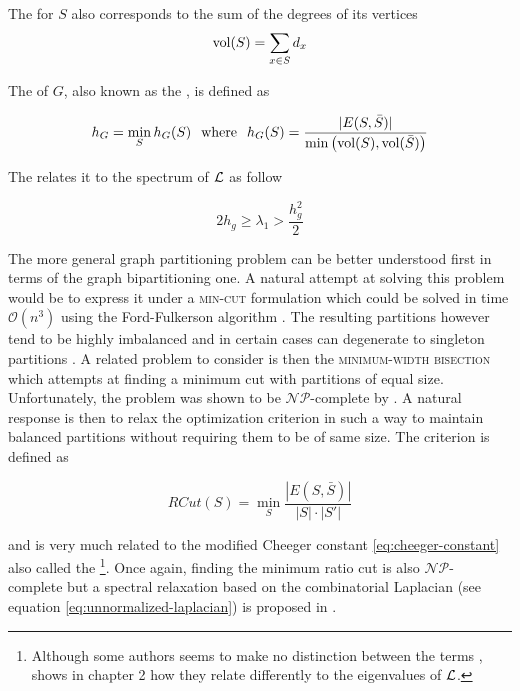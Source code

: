 The  for $S$ also corresponds to the sum of the degrees of its vertices
\begin{equation}
\operatorname{\text{vol}}(S) = \sum_{x \in S} d_x
\end{equation}

The  of $G$, also known as the  \parencite{Chung1997}, is defined as

\begin{equation}
h_G = \min_S h_G(S) \hspace{2.5mm} \text{where} \hspace{2.5mm} h_G(S) = \frac{ |E(S, \bar{S}) |}{\min \left( \operatorname{\text{vol}}(S), \operatorname{\text{vol}}(\bar{S}) \right)}
\label{eq:cheeger-constant}
\end{equation}

The  relates it to the spectrum of $\mathbf{\mathcal{L}}$ as follow \parencite{Chung1997}
\begin{lem}
\begin{equation}
2h_g \geq \lambda_1 > \frac{h_g^2}{2}
\end{equation}
\end{lem}

The more general graph partitioning problem can be better understood first in terms of
the graph bipartitioning one. A natural attempt at solving this problem would be to
express it under a \textsc{min-cut} formulation which could be solved in time
$\mathcal{O}(n^3)$ using the Ford-Fulkerson algorithm \cite{FordFulkerson1956}. The
resulting partitions however tend to be highly imbalanced and in certain cases can
degenerate to singleton partitions \cite{Hagen1992}. A related problem to consider is
then the \textsc{minimum-width bisection} which attempts at finding a minimum cut
with partitions of equal size. Unfortunately, the problem was shown to be
$\mathcal{NP}$-complete by \cite{Garey1976}. A natural response is then to relax the
optimization criterion in such a way to maintain balanced partitions without requiring
them to be of same size. The  criterion is defined as \cite{Chuen1989, Chuen1991, Hagen1992} 

\begin{equation}
RCut(S) = \min_S \frac{|E(S, \bar{S})|}{|S| \cdot |S'|}
\end{equation}

and is very much related to the modified Cheeger constant \ref{eq:cheeger-constant}
also called the  \footnote{Although some authors seems
to make no distinction between the terms \cite{ShiMalik2000, Levin2008},
\cite{Chung1997} shows in chapter 2 how they relate differently to the eigenvalues of
$\mathbf{\mathcal{L}}$.}. Once again,  finding the minimum ratio cut is also $\mathcal{NP}$-
complete but a spectral relaxation based on the combinatorial Laplacian (see equation
\ref{eq:unnormalized-laplacian}) is proposed in \cite{Hagen1992}.

